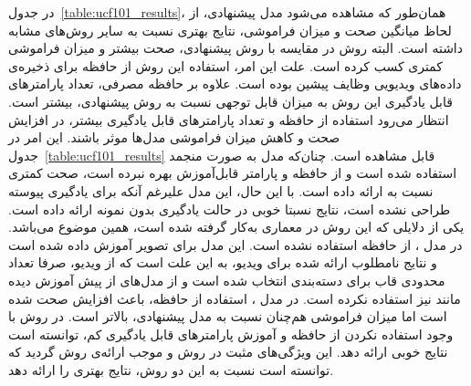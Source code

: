  در جدول~\ref{table:ucf101_results}، همان‌طور که مشاهده می‌شود مدل پیشنهادی، از لحاظ میانگین صحت و میزان فراموشی، نتایج بهتری نسبت به سایر روش‌های مشابه داشته است. البته روش  در مقایسه با روش پیشنهادی، صحت بیشتر و میزان فراموشی کمتری کسب کرده است. علت این امر، استفاده این روش از حافظه برای ذخیره‌ی داده‌های ویدیویی وظایف پیشین بوده است. علاوه بر حافظه‌ مصرفی، تعداد پارامترهای قابل یادگیری این روش به میزان قابل توجهی نسبت به روش پیشنهادی، بیشتر است. انتظار می‌رود استفاده از حافظه و تعداد پارامترهای قابل یادگیری بیشتر، در افزایش صحت و کاهش میزان فراموشی مدل‌ها موثر باشند. این امر در جدول~\ref{table:ucf101_results} قابل مشاهده است. چنان‌که مدل  به صورت منجمد استفاده شده است و از حافظه و پارامتر قابل‌آموزش بهره نبرده است، صحت کمتری نسبت به  ارائه داده است. با این حال، این مدل علیرغم آنکه برای یادگیری پیوسته طراحی نشده است، نتایج نسبتا خوبی در حالت یادگیری بدون نمونه ارائه داده است. یکی از دلایلی که این روش در معماری 
 به‌کار گرفته شده است، همین موضوع می‌باشد. در مدل ، از حافظه استفاده نشده است. این مدل برای تصویر آموزش داده شده است و نتایج نامطلوب ارائه شده برای ویدیو، به این علت است که از ویدیو، صرفا تعداد محدودی قاب برای دسته‌بندی انتخاب شده است و از مدل‌های از پیش آموزش دیده مانند  نیز استفاده نکرده است. در مدل ، استفاده از حافظه، باعث افزایش صحت شده است اما میزان فراموشی هم‌چنان نسبت به مدل پیشنهادی، بالاتر است. در روش  با وجود استفاده نکردن از حافظه و آموزش پارامترهای قابل یادگیری کم، توانسته است نتایج خوبی ارائه دهد. این ویژگی‌های مثبت در روش  و  موجب ارائه‌ی روش 
 گردید که توانسته است نسبت به این دو روش، نتایج بهتری را ارائه دهد.
 
